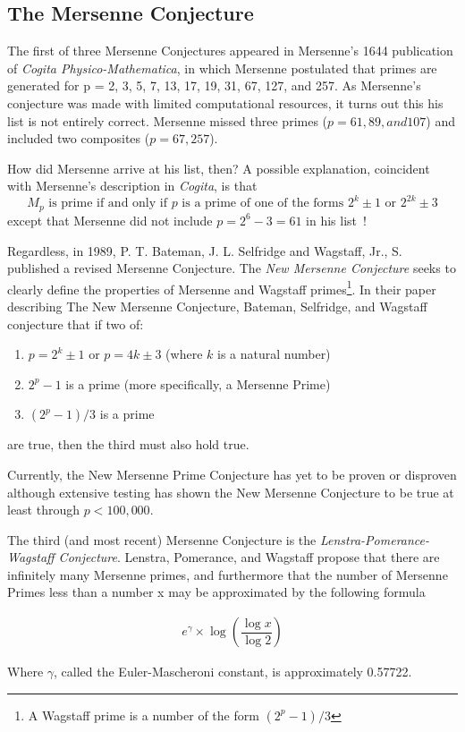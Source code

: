 \subsection{The Mersenne Conjecture}

The first of three Mersenne Conjectures appeared in Mersenne’s 1644 publication of 
\textit{Cogita Physico-Mathematica}, in which Mersenne postulated that primes are generated for p = 2, 3, 5,
7, 13, 17, 19, 31, 67, 127, and 257. As Mersenne's conjecture was made with limited computational
resources, it turns out this his list is not entirely correct.
Mersenne missed three primes ($p = 61, 89, and 107$) and included two composites ($p = 67, 257$).

How did Mersenne arrive at his list, then? A possible explanation, coincident with Mersenne's description in
\textit{Cogita}, is that
\begin{equation}
    M_p \text{ is prime if and only if $p$ is a prime of one of the forms } 2^k\pm1 \text{ or } 2^{2k}\pm3
\end{equation}
except that Mersenne did not include $p = 2^{6}-3 = 61$ in his list~\cite{newconjecture}!

Regardless, in 1989, P. T. Bateman, J. L. Selfridge and Wagstaff, Jr., S. published a revised Mersenne Conjecture.
The \textit{New Mersenne Conjecture} seeks to clearly define the properties of Mersenne and Wagstaff primes\footnote{A Wagstaff prime is a number of the form $(2^p-1)/3$}.
In their paper describing The New Mersenne Conjecture, Bateman, Selfridge, and Wagstaff conjecture that if two of: 
\begin{enumerate}
\item $p = 2^k \pm 1$ or $p = 4k \pm 3$ (where $k$ is a natural number)
\item $2^p - 1$ is a prime (more specifically, a Mersenne Prime)
\item $(2^p - 1)/3$ is a prime
\end{enumerate}
are true, then the third must also hold true.

Currently, the New Mersenne Prime Conjecture has yet to be proven or disproven although extensive testing
has shown the New Mersenne Conjecture to be true at least through $p < 100,000$.

The third (and most recent) Mersenne Conjecture is the \textit{Lenstra-Pomerance-Wagstaff Conjecture}. 
Lenstra, Pomerance, and Wagstaff propose that there are infinitely many Mersenne primes, and furthermore
that the number of Mersenne Primes less than a number x may be approximated by the following formula~\cite{utm.edu-heuristic}

\begin{align}
e^{\gamma} \times \log \left( \dfrac{\log{x}}{\log{2}} \right)
\end{align}

Where $\gamma$, called the Euler-Mascheroni constant, is approximately 0.57722.
